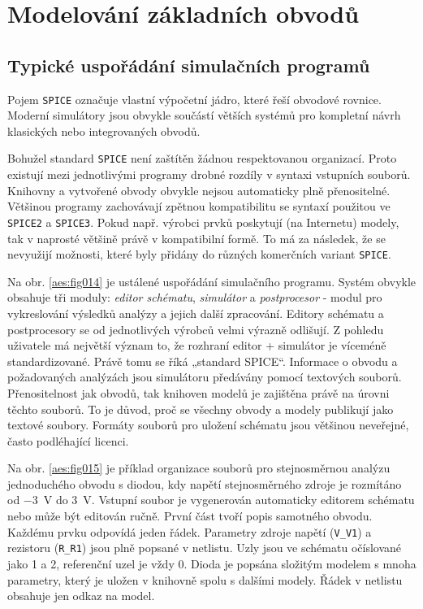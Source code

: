   \section{Modelování základních obvodů}
    \subsection{Typické uspořádání simulačních programů}
      Pojem \texttt{SPICE} označuje vlastní výpočetní jádro, které řeší obvodové rovnice. Moderní
      simulátory jsou obvykle součástí větších systémů pro kompletní návrh klasických nebo
      integrovaných obvodů.

      Bohužel standard \texttt{SPICE} není zaštítěn žádnou respektovanou organizací. Proto existují
      mezi jednotlivými programy drobné rozdíly v syntaxi vstupních souborů. Knihovny a vytvořené
      obvody obvykle nejsou automaticky plně přenositelné. Většinou programy zachovávají zpětnou
      kompatibilitu se syntaxí použitou ve \texttt{SPICE2} a \texttt{SPICE3}. Pokud např. výrobci
      prvků poskytují (na Internetu) modely, tak v naprosté většině právě v kompatibilní formě. To
      má za následek, že se nevyužijí možnosti, které byly přidány do různých komerčních variant
      \texttt{SPICE}.

      Na obr. \ref{aes:fig014} je ustálené uspořádání simulačního programu. Systém obvykle obsahuje
      tři moduly: \emph{editor schématu}, \emph{simulátor} a \emph{postprocesor} - modul pro
      vykreslování výsledků analýzy a jejich další zpracování. Editory schématu a postprocesory se
      od jednotlivých výrobců velmi výrazně odlišují. Z pohledu uživatele má největší význam to, že
      rozhraní editor + simulátor je víceméně standardizované. Právě tomu se říká „standard SPICE“.
      Informace o obvodu a požadovaných analýzách jsou simulátoru předávány pomocí textových
      souborů. Přenositelnost jak obvodů, tak knihoven modelů je zajištěna právě na úrovni těchto
      souborů. To je důvod, proč se všechny obvody a modely publikují jako textové soubory. Formáty
      souborů pro uložení schématu jsou většinou neveřejné, často podléhající licenci.


      Na obr. \ref{aes:fig015} je příklad organizace souborů pro stejnosměrnou analýzu jednoduchého
      obvodu s diodou, kdy napětí stejnosměrného zdroje je rozmítáno od \SI{-3}{\V} do \SI{+3}{\V}.
      Vstupní soubor je vygenerován automaticky editorem schématu nebo může být editován ručně.
      První část tvoří popis samotného obvodu. Každému prvku odpovídá jeden řádek. Parametry zdroje
      napětí (\texttt{V\_V1}) a rezistoru (\texttt{R\_R1}) jsou plně popsané v netlistu. Uzly jsou
      ve schématu očíslované jako \num{1} a \num{2}, referenční uzel je vždy \num{0}. Dioda je
      popsána složitým modelem s mnoha parametry, který je uložen v knihovně spolu s dalšími modely.
      Řádek v netlistu obsahuje jen odkaz na model.

